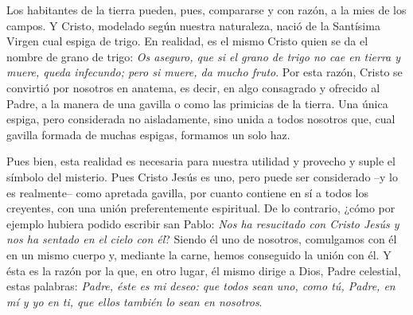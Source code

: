 \begin{body}
Los habitantes de la tierra pueden, pues, compararse y con razón, a la mies de los campos. Y Cristo, modelado según nuestra naturaleza, nació de la Santísima Virgen cual espiga de trigo. En realidad, es el mismo Cristo quien se da el nombre de grano de trigo: \textit{Os aseguro, que si el grano de trigo no cae en tierra y muere, queda infecundo; pero si muere, da mucho fruto}. Por esta razón, Cristo se convirtió por nosotros en anatema, es decir, en algo consagrado y ofrecido al Padre, a la manera de una gavilla o como las primicias de la tierra. Una única espiga, pero considerada no aisladamente, sino unida a todos nosotros que, cual gavilla formada de muchas espigas, formamos un solo haz.

Pues bien, esta realidad es necesaria para nuestra utilidad y provecho y suple el símbolo del misterio. Pues Cristo Jesús es uno, pero puede ser considerado –y lo es realmente– como apretada gavilla, por cuanto contiene en sí a todos los creyentes, con una unión preferentemente espiritual. De lo contrario, ¿cómo por ejemplo hubiera podido escribir san Pablo: \textit{Nos ha resucitado con Cristo Jesús y nos ha sentado en el cielo con él}? Siendo él uno de nosotros, comulgamos con él en un mismo cuerpo y, mediante la carne, hemos conseguido la unión con él. Y ésta es la razón por la que, en otro lugar, él mismo dirige a Dios, Padre celestial, estas palabras: \textit{Padre, éste es mi deseo: que todos sean uno, como tú, Padre, en mí y yo en ti, que ellos también lo sean en nosotros}.
\end{body}

